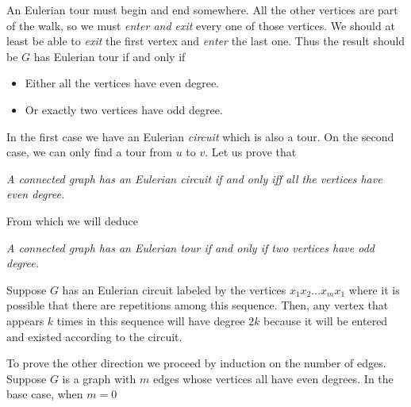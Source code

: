 \documentclass[12pt]{memoir}
\begin{document}
\begin{ptcbr}
    An Eulerian tour must begin and end somewhere. All the other vertices are part of the walk, so we must \emph{enter and exit} every one of those vertices. We should at least be able to \emph{exit} the first vertex and \emph{enter} the last one. Thus the result should be $G$ has Eulerian tour if and only if
    \begin{itemize}
        \itemsep=-0.4em
        \item Either all the vertices have even degree.
        \item Or exactly two vertices have odd degree. 
    \end{itemize}
    In the first case we have an Eulerian \emph{circuit} which is also a tour. On the second case, we can only find a tour from $u$ to $v$.
    Let us prove that 
\begin{center}
    \emph{A connected graph has an Eulerian circuit if and only iff all the vertices have even degree.}
\end{center}
From which we will deduce
\begin{center}
    \emph{A connected graph has an Eulerian tour if and only if two vertices have odd degree.}
\end{center}
Suppose $G$ has an Eulerian circuit labeled by the vertices $x_{1}x_{2}\dots x_mx_1$ where it is possible that there are repetitions among this sequence. Then, any vertex that appears $k$ times in this sequence will have degree $2k$ because it will be entered and existed according to the circuit.\par 
To prove the other direction we proceed by induction on the number of edges. Suppose $G$ is a graph with $m$ edges whose vertices all have even degrees. In the base case, when $m=0$
\end{ptcbr}
\fi
\end{document}
